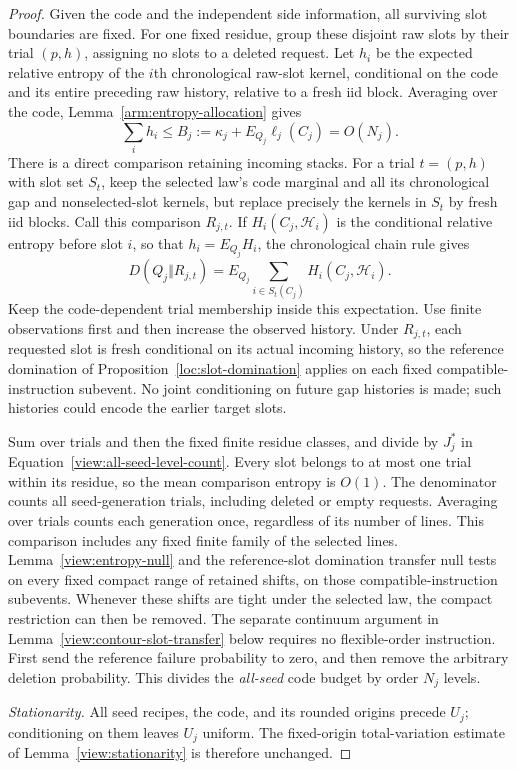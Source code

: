 \begin{proof}
Given the code and the independent side information, all surviving
slot boundaries are fixed.  For one fixed residue, group these disjoint
raw slots by their trial $(p,h)$, assigning no slots to a deleted
request.  Let $h_i$ be the expected relative entropy of the $i$th
chronological raw-slot kernel, conditional on the code and its entire
preceding raw history, relative to a fresh iid block.  Averaging over
the code, Lemma~\ref{arm:entropy-allocation} gives
\[
 \sum_i h_i\le B_j:=\kappa_j+E_{Q_j}\ell_j(C_j)=O(N_j).
\]
There is a direct comparison retaining incoming stacks.  For a trial
$t=(p,h)$ with slot set $S_t$, keep the selected law's code marginal
and all its chronological gap and nonselected-slot kernels, but
replace precisely the kernels in $S_t$ by fresh iid blocks.  Call this
comparison $R_{j,t}$.  If $H_i(C_j,\mathcal H_i)$ is the conditional
relative entropy before slot $i$, so that $h_i=E_{Q_j}H_i$, the
chronological chain rule gives
\[
 D(Q_j\Vert R_{j,t})
 =E_{Q_j}\sum_{i\in S_t(C_j)}H_i(C_j,\mathcal H_i).
\]
Keep the code-dependent trial membership inside this expectation.
Use finite observations first and then increase the observed history.
Under $R_{j,t}$,
each requested slot is fresh conditional on its actual incoming history,
so the reference domination of Proposition~\ref{loc:slot-domination}
applies on each fixed compatible-instruction subevent.  No joint
conditioning on future gap histories is made; such
histories could encode the earlier target slots.

Sum over trials and then the fixed finite residue classes, and divide
by $J_j^*$ in Equation~\eqref{view:all-seed-level-count}.  Every slot
belongs to at most one trial within its residue, so the mean comparison
entropy is $O(1)$.  The denominator counts all seed-generation trials,
including deleted or empty requests.  Averaging over trials counts each
generation once, regardless of its number of lines.  This comparison
includes any fixed finite family of the
selected lines.  Lemma~\ref{view:entropy-null}
and the reference-slot domination transfer null tests on every fixed
compact range of retained shifts, on those compatible-instruction
subevents.  Whenever these shifts are tight under the selected law,
the compact restriction can then be removed.  The separate
continuum argument in Lemma~\ref{view:contour-slot-transfer} below
requires no flexible-order instruction.
First send the reference failure probability to zero, and then remove
the arbitrary deletion probability.  This divides the
\emph{all-seed} code budget by order $N_j$ levels.

\smallskip\noindent\emph{Stationarity.}
All seed recipes, the code, and its rounded origins precede $U_j$;
conditioning on them leaves $U_j$ uniform.  The fixed-origin
total-variation estimate of Lemma~\ref{view:stationarity} is therefore
unchanged.
\end{proof}

